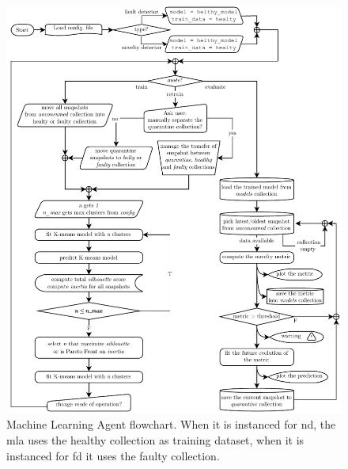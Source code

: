 \begin{figure}
    \centering
    \includegraphics[width=\textwidth]{images/Framework/MLA.pdf}
    \caption{Machine Learning Agent flowchart. When it is instanced for \gls{nd}, the \gls{mla} uses the healthy collection as training dataset, when it is instanced for \gls{fd} it uses the faulty collection.}
    \label{fig:MLA_structure}
\end{figure}


